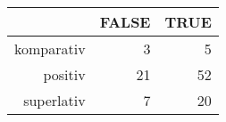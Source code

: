 \begin{tabular}{rrr}
  \hline
 & FALSE & TRUE \\ 
  \hline
komparativ & 3 & 5 \\ 
  positiv & 21 & 52 \\ 
  superlativ & 7 & 20 \\ 
   \hline
\end{tabular}
